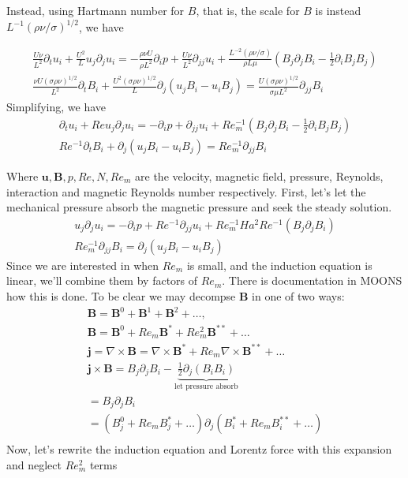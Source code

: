 \documentclass[11pt]{article}
\newcommand{\B}{\mathbf{B}}
\newcommand{\U}{\mathbf{u}}
\newcommand{\curl}{\nabla \times}
\newcommand{\PD}{\partial}
\newcommand{\J}{\mathbf{j}}
\begin{document}
Instead, using Hartmann number for $B$, that is, the scale for $B$ is instead $L^{-1} (\rho \nu / \sigma)^{1/2}$, we have

\begin{equation}\begin{aligned}
\frac{U \nu}{L^2} \PD_t u_i+ \frac{U^2}{L} u_j\PD_j u_i =-\frac{\rho \nu U}{\rho L^2}\PD_i p+ \frac{U \nu}{L^2} \PD_{jj} u_i + \frac{L^{-2} (\rho \nu / \sigma)}{\rho L \mu} (B_j \PD_j B_i - \tfrac{1}{2} \PD_i B_j B_j) \\
\frac{\nu U (\sigma \rho \nu)^{1/2}}{L^2} \PD_t B_i + \frac{U^2 (\sigma \rho \nu)^{1/2}}{L} \PD_j (u_j B_i - u_i B_j) = \frac{U (\sigma \rho \nu)^{1/2}}{\sigma \mu L^2} \PD_{jj} B_i
\end{aligned} \end{equation}
Simplifying, we have
\begin{equation}\begin{aligned}
\PD_t u_i+ Re u_j\PD_j u_i =-\PD_i p+ \PD_{jj} u_i + Re_m^{-1} (B_j \PD_j B_i - \tfrac{1}{2} \PD_i B_j B_j) \\
Re^{-1} \PD_t B_i + \PD_j (u_j B_i - u_i B_j) = Re_m^{-1} \PD_{jj} B_i
\end{aligned} \end{equation}

Where $\U,\B,p,Re,N,Re_m$ are the velocity, magnetic field, pressure, Reynolds, interaction and magnetic Reynolds number respectively. First, let's let the mechanical pressure absorb the magnetic pressure and seek the steady solution.
\begin{equation}\begin{aligned}
u_j\PD_j u_i =-\PD_i p+ Re^{-1} \PD_{jj} u_i + Re_m^{-1} Ha^2 Re^{-1} (B_j \PD_j B_i) \\
Re_m^{-1} \PD_{jj} B_i = \PD_j (u_j B_i - u_i B_j)
\end{aligned} \end{equation}
Since we are interested in when $Re_m$ is small, and the induction equation is linear, we'll combine them by factors of $Re_m$. There is documentation in MOONS how this is done. To be clear we may decompse $\B$ in one of two ways:
\begin{equation}\begin{aligned}
	\B = \B^0 + \B^1 + \B^2 + \hdots , \\
	\B = \B^0 + Re_m \B^* + Re_m^2 \B^{**} + \hdots \\
	\J = \curl \B = \curl \B^* + Re_m \curl \B^{**} + \hdots \\
	\J \times \B = B_j \PD_j B_i - \underbrace{\tfrac{1}{2} \PD_j (B_i B_i)}_{\text{let pressure absorb}} \\
	= B_j \PD_j B_i \\
	= (B_j^0+Re_m B_j^* + \hdots) \PD_j (B_i^*+Re_m B_i^{**} + \hdots) \\
\end{aligned} \end{equation}
Now, let's rewrite the induction equation and Lorentz force with this expansion and neglect $Re_m^2$ terms
\end{document}
